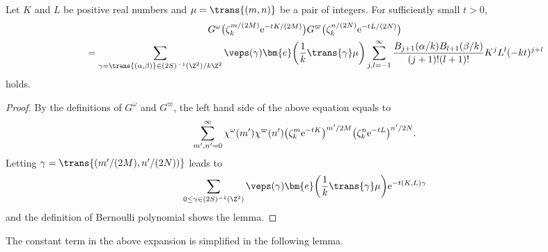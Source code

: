 \begin{lem} \label{lem:G(z)_asymptotic}
	Let $ K $ and $ L$ be positive real numbers and $\mu = \trans{(m, n)}$ be a pair of integers.
	For sufficiently small $t > 0$,
	\begin{gather*}
		G^\omega\big(\zeta_k^{m/(2M)} {\rm e}^{-tK/(2M)}\big) G^\varpi\big(\zeta_k^{n/(2N)} {\rm e}^{-tL/(2N)}\big)
\\ \qquad
	{}	= 		\sum_{\gamma = \trans{(\alpha, \beta)} \in (2S)^{-1}(\Z^2)/k\Z^2} \veps(\gamma) \bm{e}\bigg(\frac{1}{k} {\trans{\gamma}} \mu\bigg)
		\sum_{j,l = -1}^\infty \frac{B_{j+1}(\alpha/k) B_{l+1}(\beta/k)}{(j+1)! (l+1)!} K^j L^l (-kt)^{j+l}
	\end{gather*}
	holds.
\end{lem}
\begin{proof}
	By the definitions of $G^\omega$ and $G^\varpi$, the left hand side of the above equation equals to
	\begin{gather*}
	\sum_{m', n' = 0}^\infty \chi^\omega(m') \chi^\varpi(n')
	\big(\zeta_k^{m} {\rm e}^{-tK}\big)^{m'/2M} \big(\zeta_k^{n} {\rm e}^{-tL}\big)^{n'/2N}.
	\end{gather*}
	Letting $ \gamma = \trans{(m'/(2M), n'/(2N))} $ leads to
	\begin{gather*}
	\sum_{0 \le \gamma \in (2S)^{-1}(\Z^2)} \veps(\gamma) \bm{e}\bigg( \frac{1}{k} \trans{\gamma} \mu \bigg)
	{\rm e}^{-t (K, L) \gamma}
	\end{gather*}
	and the definition of Bernoulli polynomial shows the lemma.
\end{proof}

The constant term in the above expansion is simplified in the following lemma.

